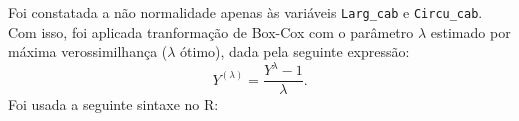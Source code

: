 \documentclass[
  portuguese,
  11pt,
]{article}
\begin{document}
\begin{table}

\caption{\label{tbl-SHAPIRO_UNIVAR}Teste de Shapiro-Wilk para
Normalidade Univariada.}


\end{table}%

Foi constatada a não normalidade apenas às variáveis \texttt{Larg\_cab}
e \texttt{Circu\_cab}. Com isso, foi aplicada tranformação de Box-Cox
com o parâmetro \(\lambda\) estimado por máxima verossimilhança
(\(\lambda\) ótimo), dada pela seguinte expressão:
\[Y^{(\lambda)} = \dfrac{Y^{\lambda} - 1}{\lambda}.\] Foi usada a
seguinte sintaxe no R:
\end{document}
